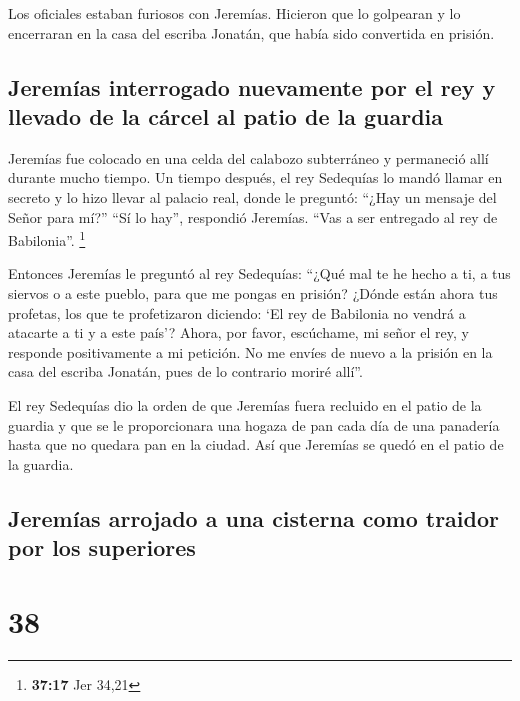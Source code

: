  Los oficiales estaban furiosos con Jeremías. Hicieron
que lo golpearan y lo encerraran en la casa del escriba Jonatán, que
había sido convertida en prisión.

\hypertarget{jeremuxedas-interrogado-nuevamente-por-el-rey-y-llevado-de-la-cuxe1rcel-al-patio-de-la-guardia}{%
\subsection{Jeremías interrogado nuevamente por el rey y llevado de la
cárcel al patio de la
guardia}\label{jeremuxedas-interrogado-nuevamente-por-el-rey-y-llevado-de-la-cuxe1rcel-al-patio-de-la-guardia}}

 Jeremías fue colocado en una celda del calabozo
subterráneo y permaneció allí durante mucho tiempo.  Un
tiempo después, el rey Sedequías lo mandó llamar en secreto y lo hizo
llevar al palacio real, donde le preguntó: ``¿Hay un mensaje del Señor
para mí?'' ``Sí lo hay'', respondió Jeremías. ``Vas a ser entregado al
rey de Babilonia''. \footnote{\textbf{37:17} Jer 34,21}

 Entonces Jeremías le preguntó al rey Sedequías: ``¿Qué
mal te he hecho a ti, a tus siervos o a este pueblo, para que me pongas
en prisión?  ¿Dónde están ahora tus profetas, los que te
profetizaron diciendo: `El rey de Babilonia no vendrá a atacarte a ti y
a este país'?  Ahora, por favor, escúchame, mi señor el
rey, y responde positivamente a mi petición. No me envíes de nuevo a la
prisión en la casa del escriba Jonatán, pues de lo contrario moriré
allí''.

 El rey Sedequías dio la orden de que Jeremías fuera
recluido en el patio de la guardia y que se le proporcionara una hogaza
de pan cada día de una panadería hasta que no quedara pan en la ciudad.
Así que Jeremías se quedó en el patio de la guardia.

\hypertarget{jeremuxedas-arrojado-a-una-cisterna-como-traidor-por-los-superiores}{%
\subsection{Jeremías arrojado a una cisterna como traidor por los
superiores}\label{jeremuxedas-arrojado-a-una-cisterna-como-traidor-por-los-superiores}}

\hypertarget{section-37}{%
\section{38}\label{section-37}}

